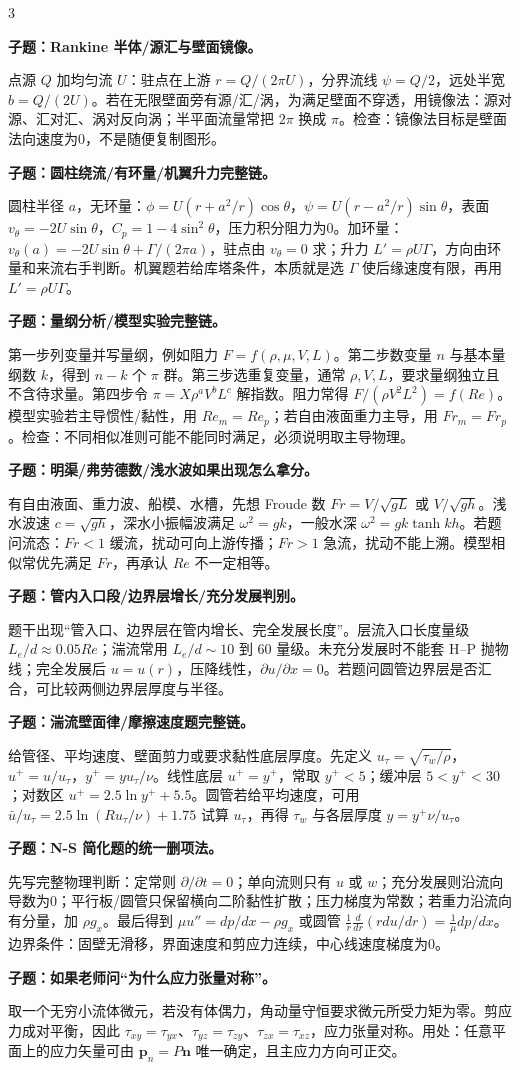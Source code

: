 \documentclass[a4paper]{article}
\newcommand{\qt}[1]{\vspace{0.10pt}\colorbox{Q}{\parbox{\dimexpr\linewidth-2\fboxsep}{\color{white}\bfseries #1}}\par}
\newcommand{\ans}[1]{\colorbox{G}{\parbox{\dimexpr\linewidth-2\fboxsep}{#1}}\par}
\begin{document}
\begin{multicols}{3}
\qt{子题：Rankine 半体/源汇与壁面镜像。}
\ans{点源 $Q$ 加均匀流 $U$：驻点在上游 $r=Q/(2\pi U)$，分界流线 $\psi=Q/2$，远处半宽 $b=Q/(2U)$。若在无限壁面旁有源/汇/涡，为满足壁面不穿透，用镜像法：源对源、汇对汇、涡对反向涡；半平面流量常把 $2\pi$ 换成 $\pi$。检查：镜像法目标是壁面法向速度为0，不是随便复制图形。}
\qt{子题：圆柱绕流/有环量/机翼升力完整链。}
\ans{圆柱半径 $a$，无环量：$\phi=U(r+a^2/r)\cos\theta$，$\psi=U(r-a^2/r)\sin\theta$，表面 $v_\theta=-2U\sin\theta$，$C_p=1-4\sin^2\theta$，压力积分阻力为0。加环量：$v_\theta(a)=-2U\sin\theta+\Gamma/(2\pi a)$，驻点由 $v_\theta=0$ 求；升力 $L'=\rho U\Gamma$，方向由环量和来流右手判断。机翼题若给库塔条件，本质就是选 $\Gamma$ 使后缘速度有限，再用 $L'=\rho U\Gamma$。}
\qt{子题：量纲分析/模型实验完整链。}
\ans{第一步列变量并写量纲，例如阻力 $F=f(\rho,\mu,V,L)$。第二步数变量 $n$ 与基本量纲数 $k$，得到 $n-k$ 个 $\pi$ 群。第三步选重复变量，通常 $\rho,V,L$，要求量纲独立且不含待求量。第四步令 $\pi=X\rho^aV^bL^c$ 解指数。阻力常得 $F/(\rho V^2L^2)=f(Re)$。模型实验若主导惯性/黏性，用 $Re_m=Re_p$；若自由液面重力主导，用 $Fr_m=Fr_p$。检查：不同相似准则可能不能同时满足，必须说明取主导物理。}
\qt{子题：明渠/弗劳德数/浅水波如果出现怎么拿分。}
\ans{有自由液面、重力波、船模、水槽，先想 Froude 数 $Fr=V/\sqrt{gL}$ 或 $V/\sqrt{gh}$。浅水波速 $c=\sqrt{gh}$，深水小振幅波满足 $\omega^2=gk$，一般水深 $\omega^2=gk\tanh kh$。若题问流态：$Fr<1$ 缓流，扰动可向上游传播；$Fr>1$ 急流，扰动不能上溯。模型相似常优先满足 $Fr$，再承认 $Re$ 不一定相等。}
\qt{子题：管内入口段/边界层增长/充分发展判别。}
\ans{题干出现“管入口、边界层在管内增长、完全发展长度”。层流入口长度量级 $L_e/d\approx0.05Re$；湍流常用 $L_e/d\sim10$ 到 $60$ 量级。未充分发展时不能套 H--P 抛物线；完全发展后 $u=u(r)$，压降线性，$\partial u/\partial x=0$。若题问圆管边界层是否汇合，可比较两侧边界层厚度与半径。}
\qt{子题：湍流壁面律/摩擦速度题完整链。}
\ans{给管径、平均速度、壁面剪力或要求黏性底层厚度。先定义 $u_\tau=\sqrt{\tau_w/\rho}$，$u^+=u/u_\tau$，$y^+=yu_\tau/\nu$。线性底层 $u^+=y^+$，常取 $y^+<5$；缓冲层 $5<y^+<30$；对数区 $u^+=2.5\ln y^+ +5.5$。圆管若给平均速度，可用 $\bar u/u_\tau=2.5\ln(Ru_\tau/\nu)+1.75$ 试算 $u_\tau$，再得 $\tau_w$ 与各层厚度 $y= y^+\nu/u_\tau$。}
\qt{子题：N-S 简化题的统一删项法。}
\ans{先写完整物理判断：定常则 $\partial/\partial t=0$；单向流则只有 $u$ 或 $w$；充分发展则沿流向导数为0；平行板/圆管只保留横向二阶黏性扩散；压力梯度为常数；若重力沿流向有分量，加 $\rho g_x$。最后得到 $\mu u''=dp/dx-\rho g_x$ 或圆管 $\frac1r\frac d{dr}(rdu/dr)=\frac1\mu dp/dx$。边界条件：固壁无滑移，界面速度和剪应力连续，中心线速度梯度为0。}
\qt{子题：如果老师问“为什么应力张量对称”。}
\ans{取一个无穷小流体微元，若没有体偶力，角动量守恒要求微元所受力矩为零。剪应力成对平衡，因此 $\tau_{xy}=\tau_{yx}$、$\tau_{yz}=\tau_{zy}$、$\tau_{zx}=\tau_{xz}$，应力张量对称。用处：任意平面上的应力矢量可由 $\bm p_n=P\bm n$ 唯一确定，且主应力方向可正交。}


\end{multicols}
\end{document}
